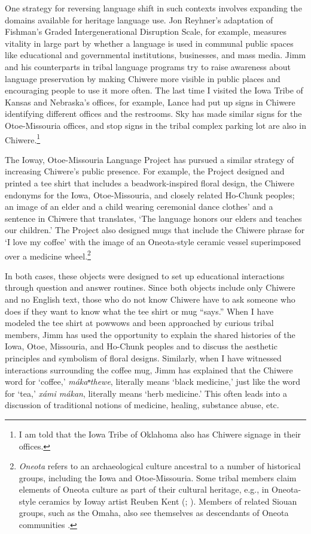 \documentclass[output=paper]{LSP/langsci}
\begin{document}
One strategy for reversing language shift in such contexts involves expanding the domains available for heritage language use. Jon Reyhner's \citeyearpar[vii]{Reyhner1999} adaptation of Fishman's \citeyearpar{Fishman1991} Graded Intergenerational Disruption Scale, for example, measures vitality in large part by whether a language is used in communal public spaces like educational and governmental institutions, businesses, and mass media. Jimm and his counterparts in tribal language programs try to raise awareness about language preservation by making Chiwere more visible in public places and encouraging people to use it more often. The last time I visited the Iowa Tribe of Kansas and Nebraska's offices, for example, Lance had put up signs in Chiwere identifying different offices and the restrooms. Sky has made similar signs for the Otoe-Missouria offices, and stop signs in the tribal complex parking lot are also in Chiwere.\footnote{I am told that the Iowa Tribe of Oklahoma also has Chiwere signage in their offices.}

The Ioway, Otoe-Missouria Language Project has pursued a similar strategy of increasing Chiwere's public presence. For example, the Project designed and printed a tee shirt that includes a beadwork-inspired floral design, the Chiwere endonyms for the Iowa, Otoe-Missouria, and closely related Ho-Chunk peoples; an image of an elder and a child wearing ceremonial dance clothes' and a sentence in Chiwere that translates, `The language honors our elders and teaches our children.' The Project also designed mugs that include the Chiwere phrase for `I love my coffee' with the image of an Oneota-style ceramic vessel superimposed over a medicine wheel.\footnote{\emph{Oneota} refers to an archaeological culture ancestral to a number of historical groups, including the Iowa and Otoe-Missouria. Some tribal members claim elements of Oneota culture as part of their cultural heritage, e.g., in Oneota-style ceramics by Ioway artist Reuben Kent (\citeyear{KentND}; \citealt{RundleRundle2007}). Members of related Siouan groups, such as the Omaha, also see themselves as descendants of Oneota communities \citep{Buffalohead2004}.}

In both cases, these objects were designed to set up educational interactions through question and answer routines. Since both objects include only Chiwere and no English text, those who do not know Chiwere have to ask someone who does if they want to know what the tee shirt or mug ``says.'' When I have modeled the tee shirt at powwows and been approached by curious tribal members, Jimm has used the opportunity to explain the shared histories of the Iowa, Otoe, Missouria, and Ho-Chunk peoples and to discuss the aesthetic principles and symbolism of floral designs. Similarly, when I have witnessed interactions surrounding the coffee mug, Jimm has explained that the Chiwere word for `coffee,' \emph{mákaⁿthewe}, literally means `black medicine,' just like the word for `tea,' \emph{xámi mákan}, literally means `herb medicine.' This often leads into a discussion of traditional notions of medicine, healing, substance abuse, etc.
\end{document}
